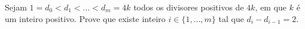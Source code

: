 Sejam $1 = d_0 < d_1 < \dots < d_m = 4k$ todos os divisores positivos de $4k$, em que $k$ é um inteiro positivo. Prove que existe inteiro $i \in \{1, \dots, m\}$ tal que $d_i - d_{i-1} = 2$.
